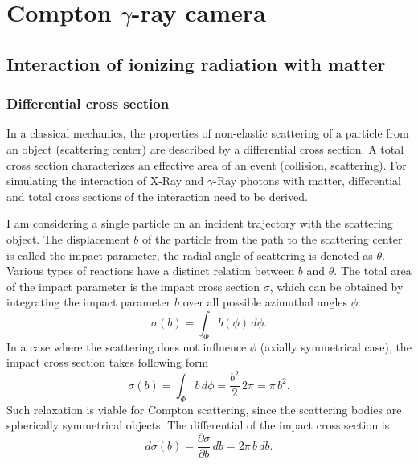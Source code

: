 \documentclass[a4paper,11pt,titlepage,twoside]{book}
\begin{document}
\chapter{Compton $\gamma$-ray camera}

\section{Interaction of ionizing radiation with matter}


\subsection{Differential cross section}


In a classical mechanics, the properties of non-elastic scattering of a particle from an object (scattering center) are described by a differential cross section.
A total cross section characterizes an effective area of an event (collision, scattering).
For simulating the interaction of X-Ray and $\gamma$-Ray photons with matter, differential and total cross sections of the interaction need to be derived.

I am considering a single particle on an incident trajectory with the scattering object.
The displacement $b$ of the particle from the path to the scattering center is called the impact parameter, the radial angle of scattering is denoted as $\theta$.
Various types of reactions have a distinct relation between $b$ and $\theta$.
The total area of the impact parameter is the impact cross section $\sigma$, which can be obtained by integrating the impact parameter $b$ over all possible azimuthal angles $\phi$:
\begin{equation}
  \sigma\left(b\right) = \int_\Phi b\left(\phi\right)\,d\phi.
\end{equation}
In a case where the scattering does not influence $\phi$ (axially symmetrical case), the impact cross section takes following form
\begin{equation}
  \sigma\left(b\right) = \int_\Phi b\,d\phi = \frac{b^{2}}{2}\,2\pi = \pi\,b^2.
\end{equation}
Such relaxation is viable for Compton scattering, since the scattering bodies are spherically symmetrical objects.
The differential of the impact cross section is
\begin{equation}
  d\sigma\left(b\right) = \frac{\partial \sigma}{\partial b}\,db = 2\pi\,b\,db.
\end{equation}
\end{document}
